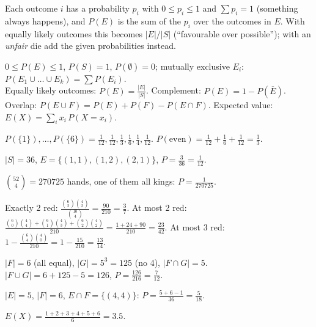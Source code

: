 \documentclass{fkt-notes}
\theoremstyle{definition}
\begin{document}
\begin{rulepar}
  Each outcome $i$ has a probability $p_i$ with $0\le p_i\le1$ and $\sum p_i=1$ (something always happens), and $P(E)$ is the sum of the $p_i$ over the outcomes in $E$. With equally likely outcomes this becomes $|E|/|S|$ (``favourable over possible''); with an \emph{unfair} die add the given probabilities instead.
\end{rulepar}

\begin{rulebox}[title=Probability rules]
  $0\le P(E)\le1$, \quad $P(S)=1$, \quad $P(\emptyset)=0$;\quad
  mutually exclusive $E_i$: $P(E_1\cup\dots\cup E_k)=\sum P(E_i)$.\\
  Equally likely outcomes: $\displaystyle P(E)=\frac{|E|}{|S|}$.\qquad
  Complement: $P(E)=1-P(\overline{E})$.\\
  Overlap: $P(E\cup F)=P(E)+P(F)-P(E\cap F)$.\qquad
  Expected value: $E(X)=\sum_i x_i\,P(X=x_i)$.
\end{rulebox}

\begin{example}
  $P(\{1\}),\dots,P(\{6\})=\frac1{12},\frac1{12},\frac13,\frac16,\frac14,\frac1{12}$.
  $P(\text{even})=\frac1{12}+\frac16+\frac1{12}=\frac13$.
\end{example}
\begin{example}
  $|S|=36$, $E=\{(1,1),(1,2),(2,1)\}$, $P=\frac3{36}=\frac1{12}$.
\end{example}
\begin{example}
  $\binom{52}{4}=270725$ hands, one of them all kings:
  $P=\frac1{270725}$.
\end{example}
\begin{example}
  Exactly 2 red: $\frac{\binom62\binom42}{\binom{10}4}=\frac{90}{210}=\frac37$.
  At most 2 red: $\frac{\binom60\binom44+\binom61\binom43+\binom62\binom42}{210}
    =\frac{1+24+90}{210}=\frac{23}{42}$.
  At most 3 red: $1-\frac{\binom64\binom40}{210}=1-\frac{15}{210}=\frac{13}{14}$.
\end{example}
\begin{example}
  $|F|=6$ (all equal), $|G|=5^3=125$ (no 4), $|F\cap G|=5$.
  $|F\cup G|=6+125-5=126$, $P=\frac{126}{216}=\frac7{12}$.
\end{example}
\begin{example}
  $|E|=5$, $|F|=6$, $E\cap F=\{(4,4)\}$: $P=\frac{5+6-1}{36}=\frac5{18}$.
\end{example}
\begin{example}
  $E(X)=\frac{1+2+3+4+5+6}{6}=3.5$.
\end{example}
\end{document}
